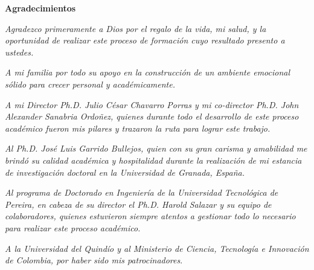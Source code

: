 
\newpage
\thispagestyle{empty}
\vspace{1cm}
{\huge \textbf{Agradecimientos}}\\
\vspace{1.5cm}

\begin{flushright}
	\textit{Agradezco primeramente a Dios por el regalo de la vida, mi salud, y la oportunidad de realizar este proceso de formación cuyo resultado presento a ustedes. }

    \vspace{0.3cm}

    \textit{A mi familia por todo su apoyo en la construcción de un ambiente emocional sólido para crecer personal y académicamente.}
    \vspace{0.3cm}

    \textit{A mi Director Ph.D. Julio César Chavarro Porras y mi co-director Ph.D. John Alexander Sanabria Ordoñez, quienes durante todo el desarrollo de este proceso académico fueron mis pilares y trazaron la ruta para lograr este trabajo.}

    \vspace{0.3cm}
    
    
	\textit{Al Ph.D. José Luis Garrido Bullejos, quien con su gran carisma y amabilidad me brindó su calidad académica y hospitalidad durante la realización de mi estancia de investigación doctoral en la Universidad de Granada, España.}

	\vspace{0.3cm}


    \textit{Al programa de Doctorado en Ingeniería de la Universidad Tecnológica de Pereira, en cabeza de su director el Ph.D. Harold Salazar y su equipo de colaboradores, quienes estuvieron siempre atentos a gestionar todo lo necesario para realizar este proceso académico.}

    \vspace{0.3cm}

    \textit{A la Universidad del Quindío y al Ministerio de Ciencia, Tecnología e Innovación de Colombia, por haber sido mis patrocinadores}.

\end{flushright}

